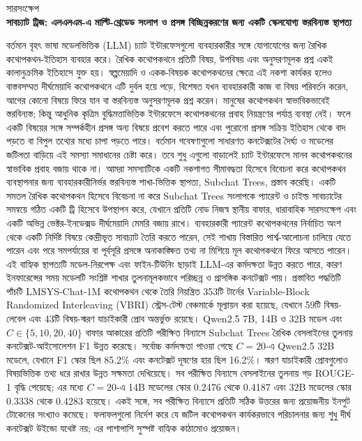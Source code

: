\begin{center}
{\bengalifont\Large সারসংক্ষেপ}\\[24pt]
{\bengalifont\bfseries সাবচ্যাট ট্রিজ: এলএলএম-এ মাল্টি-থ্রেডেড সংলাপ ও প্রসঙ্গ বিচ্ছিন্নকরণের জন্য একটি স্কেলযোগ্য স্তরবিন্যস্ত স্থাপত্য}
\end{center}
{\bengalifont
\justifying
বর্তমান বৃহৎ ভাষা মডেলভিত্তিক (LLM) চ্যাট ইন্টারফেসগুলো ব্যবহারকারীর সঙ্গে যোগাযোগের জন্য রৈখিক কথোপকথন-ইতিহাস ব্যবহার করে। রৈখিক কথোপকথনে প্রতিটি বিষয়, উপবিষয় এবং অনুসরণমূলক প্রশ্ন একই কালানুক্রমিক ইতিহাসে যুক্ত হয়। স্বল্পমেয়াদি ও একক-বিষয়ক কথোপকথনের ক্ষেত্রে এই নকশা কার্যকর হলেও বাস্তবসম্মত দীর্ঘমেয়াদি কথোপকথনে এটি দুর্বল হয়ে পড়ে, বিশেষত যখন ব্যবহারকারী কাজ বা বিষয় পরিবর্তন করেন, আগের কোনো বিষয়ে ফিরে যান বা স্তরবিন্যস্ত অনুসরণমূলক প্রশ্ন করেন। মানুষের কথোপকথন স্বাভাবিকভাবেই স্তরবিন্যস্ত; কিন্তু আধুনিক কৃত্রিম বুদ্ধিমত্তাভিত্তিক ইন্টারফেসে কথোপকথনের প্রবাহ নিয়ন্ত্রণের পর্যাপ্ত ব্যবস্থা নেই। ফলে একটি বিষয়ের সঙ্গে সম্পর্কহীন প্রসঙ্গ অন্য বিষয়ে প্রবেশ করতে পারে এবং পুরোনো প্রসঙ্গ সক্রিয় ইতিহাস থেকে বাদ পড়তে বা বিপুল তথ্যের মধ্যে চাপা পড়তে পারে। বর্তমান গবেষণাগুলো সাধারণত কনটেক্সটের দৈর্ঘ্য ও মডেলের জটিলতা বাড়িয়ে এই সমস্যা সমাধানের চেষ্টা করে। তবে শুধু এগুলো বাড়ালেই চ্যাট ইন্টারফেসে মানব কথোপকথনের স্বাভাবিক প্রবাহ বজায় থাকে না। আমরা সমস্যাটিকে একটি নকশাগত সীমাবদ্ধতা হিসেবে বিবেচনা করে কথোপকথন ব্যবস্থাপনার জন্য ব্যবহারকারীনির্ভর স্তরবিন্যস্ত শাখা-ভিত্তিক স্থাপত্য, Subchat Trees, প্রস্তাব করেছি। একটি সমতল রৈখিক কথোপকথন হিসেবে বিবেচনা না করে Subchat Trees সংলাপকে প্যারেন্ট ও চাইল্ড সাবচ্যাটের সমন্বয়ে গঠিত একটি ট্রি হিসেবে উপস্থাপন করে, যেখানে প্রতিটি নোড নিজস্ব স্থানীয় বাফার, ধারাবাহিক সারসংক্ষেপ এবং একটি অভিন্ন ভেক্টর-ইনডেক্সড দীর্ঘমেয়াদি মেমরি বজায় রাখে। ব্যবহারকারী প্যারেন্ট কথোপকথনের নির্বাচিত অংশ থেকে একটি নির্দিষ্ট বিষয়ে কেন্দ্রীভূত সাবচ্যাট তৈরি করতে পারেন, সেই শাখায় বিস্তারিত পার্শ্ব-আলোচনা চালিয়ে যেতে পারেন এবং পরে সমপর্যায়ের বা পূর্বসূরি প্রসঙ্গে অনাকাঙ্ক্ষিত তথ্য না মিশিয়ে মূল কথোপকথনে ফিরে আসতে পারেন। এই বাহ্যিক স্থাপত্যটি মডেল-নিরপেক্ষ এবং ফাইন-টিউনিং ছাড়াই LLM-এর কর্মদক্ষতা উন্নত করতে পারে, কারণ ইনফারেন্সের সময় মডেলটি সংশ্লিষ্ট শাখার তুলনামূলকভাবে পরিচ্ছন্ন ও প্রাসঙ্গিক কনটেক্সট পায়। প্রস্তাবিত পদ্ধতিটি পাঁচটি LMSYS-Chat-1M কথোপকথন থেকে তৈরি নিয়ন্ত্রিত 353টি টার্নের Variable-Block Randomized Interleaving (VBRI) স্ট্রেস-টেস্ট বেঞ্চমার্কে মূল্যায়ন করা হয়েছে, যেখানে 59টি বিষয়-লেবেল এবং 43টি বিষয়-স্মরণ যাচাইকারী প্রোব অন্তর্ভুক্ত রয়েছে। Qwen2.5 7B, 14B ও 32B মডেল এবং $C \in \{5,10,20,40\}$ বাফার আকারের প্রতিটি পরীক্ষিত বিন্যাসে Subchat Trees রৈখিক বেসলাইনের তুলনায় কনটেক্সট-আইসোলেশন F1 উন্নত করেছে। সর্বোচ্চ কর্মদক্ষতা পাওয়া গেছে $C=20$-এ Qwen2.5 32B মডেলে, যেখানে F1 স্কোর ছিল 85.2\% এবং কনটেক্সট দূষণের হার ছিল 16.2\%। স্মরণ যাচাইকারী প্রোবগুলোও বিষয়ভিত্তিক তথ্য ধরে রাখার উন্নত সক্ষমতা দেখিয়েছে। সব পরীক্ষিত বিন্যাসে বেসলাইনের তুলনায় গড় ROUGE-1 বৃদ্ধি পেয়েছে; এর মধ্যে $C=20$-এ 14B মডেলের স্কোর 0.2476 থেকে 0.4187 এবং 32B মডেলের স্কোর 0.3338 থেকে 0.4283 হয়েছে। একই সঙ্গে, সব পরীক্ষিত বিন্যাসে প্রতিটি সঠিক উত্তরের জন্য প্রয়োজনীয় ইনপুট টোকেনের সংখ্যাও কমেছে। ফলাফলগুলো নির্দেশ করে যে জটিল কথোপকথন কার্যকরভাবে পরিচালনার জন্য শুধু দীর্ঘ কনটেক্সট উইন্ডো যথেষ্ট নয়; এর পাশাপাশি সুস্পষ্ট বাহ্যিক কাঠামোও প্রয়োজন।
\par
}
